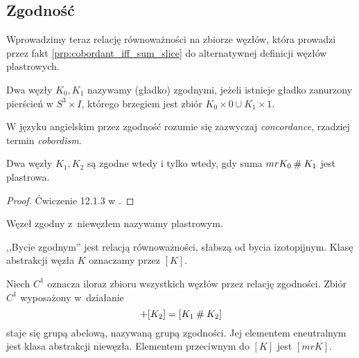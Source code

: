 \subsection{Zgodność}
Wprowadzimy teraz relację równoważności na zbiorze węzłów, która prowadzi przez fakt \ref{prp:cobordant_iff_sum_slice} do alternatywnej definicji węzłów plastrowych.

\begin{definition}[zgodność]
    Dwa węzły $K_0, K_1$ nazywamy (gładko) zgodnymi, jeżeli istnieje gładko zanurzony pierścień w $S^3 \times I$, którego brzegiem jest zbiór $K_0 \times 0 \cup K_1 \times 1$.
\end{definition}

W języku angielskim przez zgodność rozumie się zazwyczaj \emph{concordance}, rzadziej termin \emph{cobordism}.

\begin{proposition}
    \label{prp:cobordant_iff_sum_slice}
    Dwa węzły $K_1, K_2$ są zgodne wtedy i tylko wtedy, gdy suma $mr K_0 \mathbin{\#} K_1$ jest plastrowa.
\end{proposition}

\begin{proof}
    Ćwiczenie 12.1.3 w \cite{kawauchi96}.
\end{proof}

\begin{definition}
    Węzeł zgodny z~niewęzłem nazywamy plastrowym.
\end{definition}

,,Bycie zgodnym'' jest relacją równoważności, słabszą od bycia izotopijnym.
Klasę abstrakcji węzła $K$ oznaczamy przez $[K]$.

\begin{definition}
    Niech $C^1$ oznacza iloraz zbioru wszystkich węzłów przez relację zgodności.
    Zbiór $C^1$ wyposażony w~działanie
    \begin{equation}
        [K_1] + [K_2] = [K_1 \shrap K_2]
    \end{equation}
    staje się grupą abelową, nazywaną grupą zgodności.
    Jej elementem eneutralnym jest klasa abstrakcji niewęzła.
    Elementem przeciwnym do $[K]$ jest $[mr K]$.
\end{definition}


